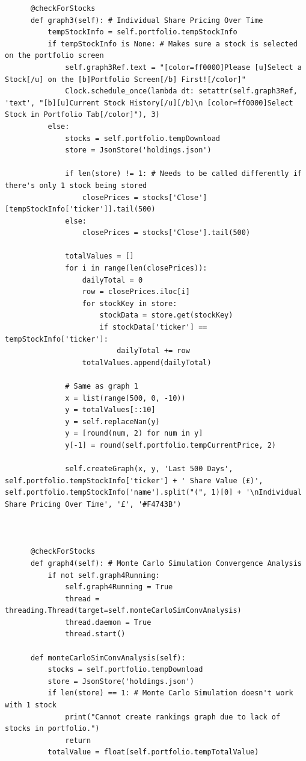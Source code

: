 \documentclass{article}
\begin{document}
\begin{verbatim}
      @checkForStocks
      def graph3(self): # Individual Share Pricing Over Time
          tempStockInfo = self.portfolio.tempStockInfo
          if tempStockInfo is None: # Makes sure a stock is selected on the portfolio screen
              self.graph3Ref.text = "[color=ff0000]Please [u]Select a Stock[/u] on the [b]Portfolio Screen[/b] First![/color]"
              Clock.schedule_once(lambda dt: setattr(self.graph3Ref, 'text', "[b][u]Current Stock History[/u][/b]\n [color=ff0000]Select Stock in Portfolio Tab[/color]"), 3)
          else:
              stocks = self.portfolio.tempDownload
              store = JsonStore('holdings.json')

              if len(store) != 1: # Needs to be called differently if there's only 1 stock being stored
                  closePrices = stocks['Close'][tempStockInfo['ticker']].tail(500)
              else:
                  closePrices = stocks['Close'].tail(500)

              totalValues = []
              for i in range(len(closePrices)): 
                  dailyTotal = 0
                  row = closePrices.iloc[i] 
                  for stockKey in store:
                      stockData = store.get(stockKey)
                      if stockData['ticker'] == tempStockInfo['ticker']:
                          dailyTotal += row
                  totalValues.append(dailyTotal)

              # Same as graph 1
              x = list(range(500, 0, -10))
              y = totalValues[::10]
              y = self.replaceNan(y)
              y = [round(num, 2) for num in y]
              y[-1] = round(self.portfolio.tempCurrentPrice, 2) 

              self.createGraph(x, y, 'Last 500 Days', self.portfolio.tempStockInfo['ticker'] + ' Share Value (£)', self.portfolio.tempStockInfo['name'].split("(", 1)[0] + '\nIndividual Share Pricing Over Time', '£', '#F4743B')



      @checkForStocks
      def graph4(self): # Monte Carlo Simulation Convergence Analysis
          if not self.graph4Running:
              self.graph4Running = True
              thread = threading.Thread(target=self.monteCarloSimConvAnalysis)
              thread.daemon = True
              thread.start()

      def monteCarloSimConvAnalysis(self): 
          stocks = self.portfolio.tempDownload
          store = JsonStore('holdings.json')
          if len(store) == 1: # Monte Carlo Simulation doesn't work with 1 stock
              print("Cannot create rankings graph due to lack of stocks in portfolio.")
              return
          totalValue = float(self.portfolio.tempTotalValue)


\end{verbatim}
\end{document}

